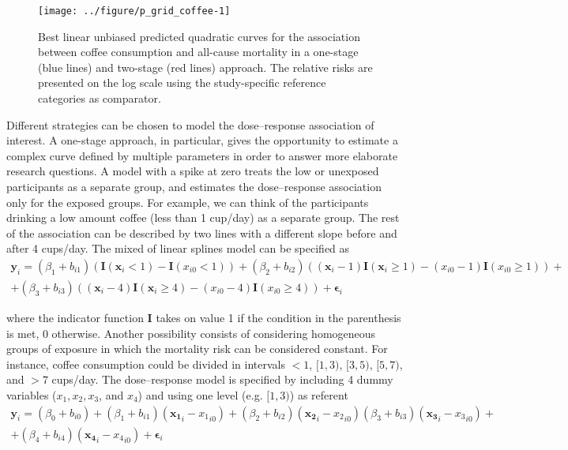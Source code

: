 \documentclass[11pt,a4paper,twoside,openany]{book}\usepackage{knitr}
\begin{document}
{{\begin{knitrout}
\begin{figure}[ht!]
{\centering \texttt{[image: ../figure/p\_grid\_coffee-1]} 

}

\caption[Best linear unbiased predicted quadratic curves for the association between coffee consumption and all-cause mortality in a one-stage (blue lines) and two-stage (red lines) approach]{Best linear unbiased predicted quadratic curves for the association between coffee consumption and all-cause mortality in a one-stage (blue lines) and two-stage (red lines) approach. The relative risks are presented on the log scale using the study-specific reference categories as comparator.}\label{fig:p_grid_coffee}
\end{figure}


\end{knitrout}



Different strategies can be chosen to model the dose--response association of interest. A one-stage approach, in particular, gives the opportunity to estimate a complex curve defined by multiple parameters in order to answer more elaborate research questions. A model with a spike at zero treats the low or unexposed participants as a separate group, and estimates the dose--response association only for the exposed groups. For example, we can think of the participants drinking a low amount coffee (less than 1 cup/day) as a separate group. The rest of the association can be described by two lines with a different slope before and after 4 cups/day. The mixed of linear splines model can be specified as
\begin{multline*}
\mathbf{y}_i = (\beta_1 + b_{i1}) \left( \mathbf{I}(\mathbf{x}_{i} < 1) - \mathbf{I}(x_{i0} < 1) \right) +(\beta_2  + b_{i2}) \left( (\mathbf{x}_{i} - 1)\mathbf{I}(\mathbf{x}_{i} \ge 1) - (x_{i0} - 1)\mathbf{I}(x_{i0} \ge 1) \right) + \\  +(\beta_3  + b_{i3}) \left( (\mathbf{x}_{i} - 4)\mathbf{I}(\mathbf{x}_{i} \ge 4) - (x_{i0} - 4)\mathbf{I}(x_{i0} \ge 4) \right) + \boldsymbol{\epsilon}_{i}
\label{spike_zero}
\end{multline*}

\noindent where the indicator function $\mathbf{I}$ takes on value 1 if the condition in the parenthesis  is met, 0 otherwise.
\noindent Another possibility consists of considering homogeneous groups of exposure in which the mortality risk can be considered constant. For instance, coffee consumption could be divided in intervals $< 1$, $[1, 3)$, $[3, 5)$, $[5, 7)$, and $> 7$ cups/day. The dose--response model is specified by including 4 dummy variables ($x_1, x_2, x_3$, and $x_4$) and using one level (e.g. $[1, 3)$) as referent
\begin{multline*}
\mathbf{y}_i =  (\beta_0 + b_{i0}) + (\beta_1 + b_{i1}) (\mathbf{x_1}_{i} - {x_1}_{i0}) + (\beta_2  + b_{i2}) (\mathbf{x_2}_{i} - {x_2}_{i0})
(\beta_3 + b_{i3}) (\mathbf{x_3}_{i} - {x_3}_{i0}) + \\  + (\beta_4 + b_{i4}) (\mathbf{x_4}_{i} - {x_4}_{i0}) + \boldsymbol{\epsilon}_{i}
\end{multline*}

}}
\end{document}
